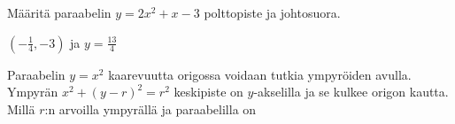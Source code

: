 \begin{tehtavasivu}
\begin{tehtava}
Määritä paraabelin $y = 2x^2+x-3$ polttopiste ja johtosuora.
	\begin{vastaus}
		$(-\frac{1}{4},-3)$ ja $y = \frac{13}{4}$
	\end{vastaus}
\end{tehtava}

\begin{tehtava}
Paraabelin $y = x^2$ kaarevuutta origossa voidaan tutkia ympyröiden avulla. Ympyrän $x^2+(y-r)^2=r^2$ keskipiste on $y$-akselilla ja se kulkee origon kautta. Millä $r$:n arvoilla ympyrällä ja paraabelilla on
\begin{vastaus}
\end{vastaus}
\end{tehtava}

\end{tehtavasivu}
